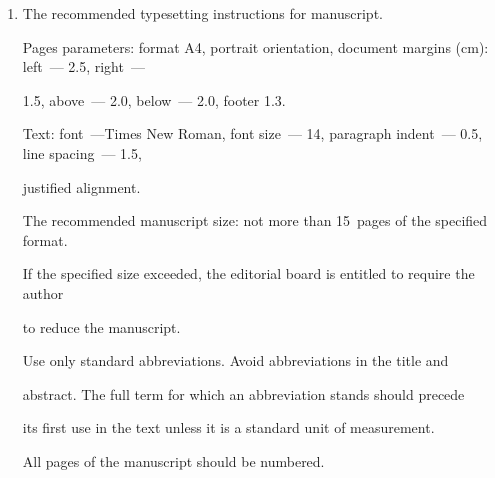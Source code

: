 {{\begin{enumerate}[1.]
.docx) or \LaTeX\ (.tex) formats, and additionally in the .pdf format. All documents\linebreak\vspace*{-12pt}





\pagebreak





\noindent


 may be sent


by e-mail or provided on a CD or diskette. A~hard copy submission is not necessary.\\[-13.5pt]





\item The recommended typesetting instructions for manuscript.





Pages parameters: format A4, portrait orientation, document margins (cm): left~--- 2.5, right~---


1.5, above~--- 2.0, below~--- 2.0, footer 1.3.





Text: font~---Times New Roman, font size~--- 14, paragraph indent~--- 0.5, line spacing~--- 1.5,


justified alignment.





The recommended manuscript size: not more than 15~pages of the specified format.


If the specified size exceeded, the editorial board is entitled to require the author


to reduce the manuscript.





Use only standard abbreviations. Avoid  abbreviations in the title and


abstract. The full term for which an abbreviation stands should precede


its first use in the text unless it is a standard unit of measurement.





All pages of the manuscript should be numbered.






\end{enumerate}}}
